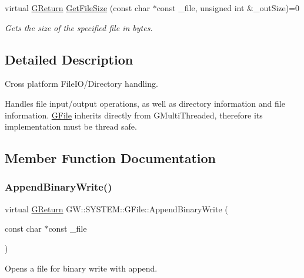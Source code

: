 \begin{DoxyCompactItemize}
virtual \mbox{\hyperlink{namespaceGW_a67a839e3df7ea8a5c5686613a7a3de21}{G\+Return}} \mbox{\hyperlink{classGW_1_1SYSTEM_1_1GFile_a2f4cba2dad96fa4c894545f43fee64b5}{Get\+File\+Size}} (const char $\ast$const \+\_\+file, unsigned int \&\+\_\+out\+Size)=0
\begin{DoxyCompactList}\small\item\em Gets the size of the specified file in bytes. \end{DoxyCompactList}\end{DoxyCompactItemize}


\subsection{Detailed Description}
Cross platform File\+I\+O/\+Directory handling. 

Handles file input/output operations, as well as directory information and file information. \mbox{\hyperlink{classGW_1_1SYSTEM_1_1GFile}{G\+File}} inherits directly from G\+Multi\+Threaded, therefore its implementation must be thread safe. 

\subsection{Member Function Documentation}
\mbox{\label{classGW_1_1SYSTEM_1_1GFile_a63311236692181f99fd393fe8e1ca9fc}} 
\subsubsection{\texorpdfstring{Append\+Binary\+Write()}{AppendBinaryWrite()}}
{\footnotesize\ttfamily virtual \mbox{\hyperlink{namespaceGW_a67a839e3df7ea8a5c5686613a7a3de21}{G\+Return}} G\+W\+::\+S\+Y\+S\+T\+E\+M\+::\+G\+File\+::\+Append\+Binary\+Write (\begin{DoxyParamCaption}\item[{const char $\ast$const}]{\+\_\+file }\end{DoxyParamCaption})\hspace{0.3cm}{\ttfamily [pure virtual]}}



Opens a file for binary write with append. 

